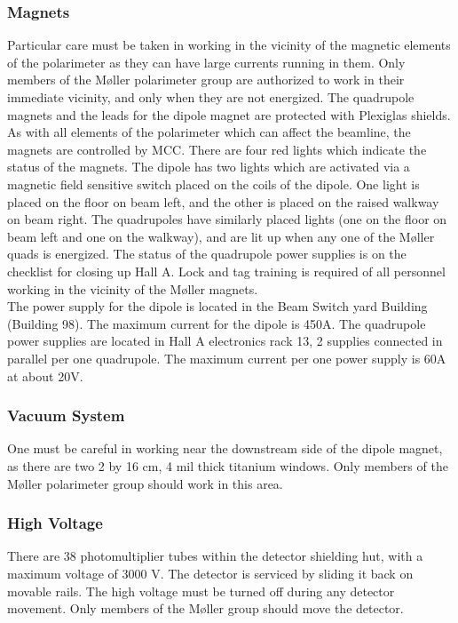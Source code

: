 \begin{safetyen}{50}{50}
\subsubsection{Magnets}

Particular care must be taken in working in the vicinity of the
magnetic elements of the polarimeter as they can have large currents
running in them. Only members of the M{\o}ller polarimeter group are
authorized to work in their immediate vicinity, and only when they are
not energized. The quadrupole magnets and the leads for the dipole magnet 
are protected with Plexiglas shields. As with all elements of the
polarimeter which can
affect the beamline, the magnets are controlled by MCC. There are four
red lights which indicate the status of the magnets. The dipole has two
lights which are activated via a magnetic field sensitive switch placed
on the coils of the dipole. One light is placed on the floor on beam left,
and the other is placed on the raised walkway on beam right. The quadrupoles
have similarly placed lights (one on the floor on beam left and one
on the walkway), and are lit up when any one of the M{\o}ller quads is 
energized. The status of the quadrupole power supplies is on the 
checklist for
closing up Hall A. Lock and tag training is required of all personnel working
in the vicinity of the M{\o}ller magnets. \\ 

The power supply for
the dipole is located in the Beam Switch yard Building (Building 98). 
The maximum current for the dipole is 450A.
The quadrupole power supplies are located in Hall A electronics rack 13,
2 supplies connected in parallel per one quadrupole. The maximum
current per one power supply is 60A at about 20V. 

\subsubsection{Vacuum System}

One must be careful in working near the downstream side of the dipole
magnet, as there are two 2 by 16 cm, 4 mil thick titanium windows.
Only members of the M{\o}ller polarimeter group should work in this
area.

\subsubsection{High Voltage}

There are 38 photomultiplier tubes within the detector
shielding hut, with a maximum voltage of 3000 V. The detector is serviced
by sliding it back on movable rails. The high voltage must be turned
off during any detector movement. Only members of the M{\o}ller group
should move the detector.\\


\end{safetyen}
